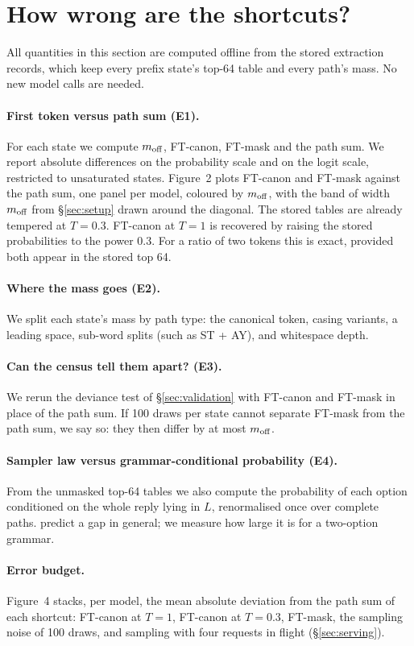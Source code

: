 \section{How wrong are the shortcuts?}
\label{sec:shortcuts}


All quantities in this section are computed offline from the stored extraction records, which keep every prefix state's top-64 table and every path's mass.
No new model calls are needed.

\paragraph{First token versus path sum (E1).}
For each state we compute $m_{\text{off}}$, FT-canon, FT-mask and the path sum.
We report absolute differences on the probability scale and on the logit scale, restricted to unsaturated states.
Figure~2 plots FT-canon and FT-mask against the path sum, one panel per model, coloured by $m_{\text{off}}$, with the band of width $m_{\text{off}}$ from \S\ref{sec:setup} drawn around the diagonal. 
The stored tables are already tempered at $T=0.3$.
FT-canon at $T=1$ is recovered by raising the stored probabilities to the power 0.3.
For a ratio of two tokens this is exact, provided both appear in the stored top 64.

\paragraph{Where the mass goes (E2).}
We split each state's mass by path type: the canonical token, casing variants, a leading space, sub-word splits (such as ST + AY), and whitespace depth. 

\paragraph{Can the census tell them apart? (E3).}
We rerun the deviance test of \S\ref{sec:validation} with FT-canon and FT-mask in place of the path sum. 
If 100 draws per state cannot separate FT-mask from the path sum, we say so: they then differ by at most $m_{\text{off}}$.

\paragraph{Sampler law versus grammar-conditional probability (E4).}
From the unmasked top-64 tables we also compute the probability of each option conditioned on the whole reply lying in $L$, renormalised once over complete paths. 
\citet{park2024grammar} predict a gap in general; we measure how large it is for a two-option grammar.

\paragraph{Error budget.}
Figure~4 stacks, per model, the mean absolute deviation from the path sum of each shortcut: FT-canon at $T=1$, FT-canon at $T=0.3$, FT-mask, the sampling noise of 100 draws, and sampling with four requests in flight (\S\ref{sec:serving}). 
